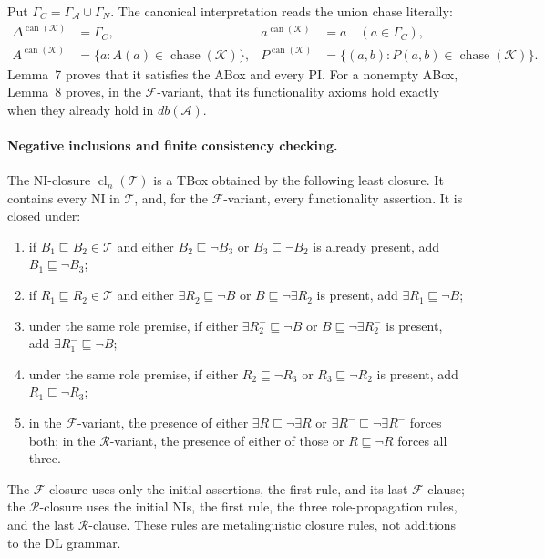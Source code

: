 Put \(\Gamma_C=\Gamma_{\mathcal A}\cup\Gamma_N\).  The canonical
interpretation reads the union chase literally:
\[
\begin{aligned}
 \Delta^{\operatorname{can}(\mathcal K)}&=\Gamma_C,&
 a^{\operatorname{can}(\mathcal K)}&=a\quad(a\in\Gamma_C),\\
 A^{\operatorname{can}(\mathcal K)}
   &=\{a:A(a)\in\operatorname{chase}(\mathcal K)\},&
 P^{\operatorname{can}(\mathcal K)}
   &=\{(a,b):P(a,b)\in\operatorname{chase}(\mathcal K)\}.
\end{aligned}
\]
Lemma~7 proves that it satisfies the ABox and every PI.  For a nonempty ABox,
Lemma~8 proves, in the \(\mathcal F\)-variant, that its functionality axioms
hold exactly when they already hold in \(db(\mathcal A)\).

\paragraph{Negative inclusions and finite consistency checking.}
The NI-closure \(\operatorname{cl}_n(\mathcal T)\) is a TBox obtained by the
following least closure.  It contains every NI in \(\mathcal T\), and, for the
\(\mathcal F\)-variant, every functionality assertion.  It is closed under:
\begin{enumerate}
\item if \(B_1\sqsubseteq B_2\in\mathcal T\) and either
\(B_2\sqsubseteq\neg B_3\) or \(B_3\sqsubseteq\neg B_2\) is already present,
add \(B_1\sqsubseteq\neg B_3\);
\item if \(R_1\sqsubseteq R_2\in\mathcal T\) and either
\(\exists R_2\sqsubseteq\neg B\) or \(B\sqsubseteq\neg\exists R_2\) is present,
add \(\exists R_1\sqsubseteq\neg B\);
\item under the same role premise, if either
\(\exists R_2^{-}\sqsubseteq\neg B\) or
\(B\sqsubseteq\neg\exists R_2^{-}\) is present, add
\(\exists R_1^{-}\sqsubseteq\neg B\);
\item under the same role premise, if either \(R_2\sqsubseteq\neg R_3\) or
\(R_3\sqsubseteq\neg R_2\) is present, add \(R_1\sqsubseteq\neg R_3\);
\item in the \(\mathcal F\)-variant, the presence of either
\(\exists R\sqsubseteq\neg\exists R\) or
\(\exists R^{-}\sqsubseteq\neg\exists R^{-}\) forces both; in the
\(\mathcal R\)-variant, the presence of either of those or
\(R\sqsubseteq\neg R\) forces all three.
\end{enumerate}
The \(\mathcal F\)-closure uses only the initial assertions, the first rule, and
its last \(\mathcal F\)-clause; the \(\mathcal R\)-closure uses the initial NIs,
the first rule, the three role-propagation rules, and the last
\(\mathcal R\)-clause.  These rules are metalinguistic closure rules, not
additions to the DL grammar.

